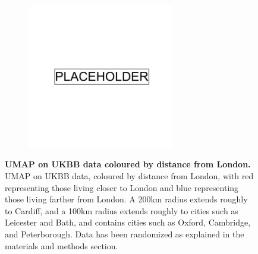 \begin{figure}[ht]
    \centering
    \begin{subfigure}{0.9\textwidth}
    \includegraphics[width=0.7\textwidth]{placeholder.png}
    \end{subfigure}
    \caption[UMAP on UKBB data coloured by distance from London]{\textbf{UMAP on UKBB data coloured by distance from London.} UMAP on UKBB data, coloured by distance from London, with red representing those living closer to London and blue representing those living farther from London. A 200km radius extends roughly to Cardiff, and a 100km radius extends roughly to cities such as Leicester and Bath, and contains cities such as Oxford, Cambridge, and Peterborough. Data has been randomized as explained in the materials and methods section.}
    \label{fig:supp_london_distance}
\end{figure}

\newpage

